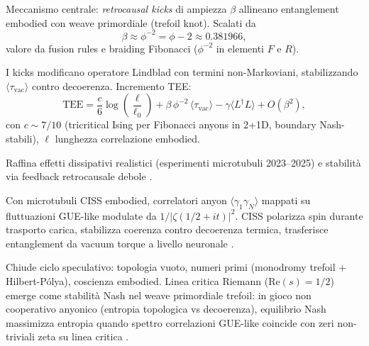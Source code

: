 \documentclass[11pt,a4paper]{article}
\let\oldcite\cite
\renewcommand{\cite}{\protect\oldcite}
\theoremstyle{plain}
\theoremstyle{definition}
\begin{document}
\vspace{0.4cm}

Meccanismo centrale: \emph{retrocausal kicks} di ampiezza $\beta$ allineano entanglement embodied con weave primordiale (trefoil knot). Scalati da
\begin{equation}
\beta \approx \phi^{-2} = \phi - 2 \approx 0.381966,
\label{eq:retrocausal-kick}
\end{equation}
valore da fusion rules e braiding Fibonacci ($\phi^{-2}$ in elementi $F$ e $R$).

I kicks modificano operatore Lindblad con termini non-Markoviani, stabilizzando $\langle \tau_{\mathrm{vac}} \rangle$ contro decoerenza. Incremento TEE:
\begin{equation}
\mathrm{TEE} = \frac{c}{6} \log \left( \frac{\ell}{\ell_0} \right) + \beta \, \phi^{-2} \, \langle \tau_{\mathrm{vac}} \rangle - \gamma \langle L^\dagger L \rangle + O(\beta^2),
\label{eq:tee_phi_dissipative}
\end{equation}
con $c \sim 7/10$ (tricritical Ising per Fibonacci anyons in 2+1D, boundary Nash-stabili), $\ell$ lunghezza correlazione embodied.

\vspace{0.4cm}

Raffina effetti dissipativi realistici (esperimenti microtubuli 2023–2025) e stabilità via feedback retrocausale debole \cite{sutherland2017retro, friederich2019retro, hameroff2023orch}.

Con microtubuli CISS embodied, correlatori anyon $\langle \gamma_1 \gamma_N \rangle$ mappati su fluttuazioni GUE-like modulate da $1/|\zeta(1/2 + i t)|^2$. CISS polarizza spin durante trasporto carica, stabilizza coerenza contro decoerenza termica, trasferisce entanglement da vacuum torque a livello neuronale \cite{naaman2024ciss, bloom2024ciss, kumar2026ciss}.


\vspace{0.4cm}

Chiude ciclo speculativo: topologia vuoto, numeri primi (monodromy trefoil + Hilbert-Pólya), coscienza embodied. Linea critica Riemann ($\mathrm{Re}(s)=1/2$) emerge come stabilità Nash nel weave primordiale trefoil: in gioco non cooperativo anyonico (entropia topologica vs decoerenza), equilibrio Nash massimizza entropia quando spettro correlazioni GUE-like coincide con zeri non-triviali zeta su linea critica \cite{hameroff2023orch, escolag2025entangled}.

\vspace{0.5cm}
\end{document}

